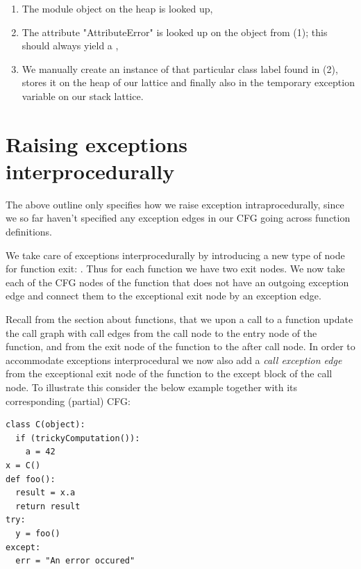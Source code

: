 \begin{enumerate}
	\item The  module object on the heap is looked up,
	\item The attribute "AttributeError" is looked up on the  object from (1); this should always yield a ,
	\item We manually create an instance of that particular class label found in (2), stores it on the heap of our lattice and finally also in the temporary exception variable on our stack lattice.
\end{enumerate}


\section{Raising exceptions interprocedurally}
The above outline only specifies how we raise exception intraprocedurally, since we so far haven't specified any exception edges in our CFG going across function definitions.

We take care of exceptions interprocedurally by introducing a new type of node for function exit: . Thus for each function we have two exit nodes. We now take each of the CFG nodes of the function that does not have an outgoing exception edge and connect them to the exceptional exit node by an exception edge.

Recall from the section about functions, that we upon a call to a function update the call graph with call edges from the call node to the entry node of the function, and from the exit node of the function to the after call node. In order to accommodate exceptions interprocedural we now also add a \textit{call exception edge} from the exceptional exit node of the function to the except block of the call node. To illustrate this consider the below example together with its corresponding (partial) CFG:

\begin{listing}[H]
	\begin{verbatim}
class C(object):
  if (trickyComputation()):
    a = 42
x = C()
def foo():
  result = x.a
  return result
try:
  y = foo()
except:
  err = "An error occured"
	\end{verbatim}
\end{listing}

